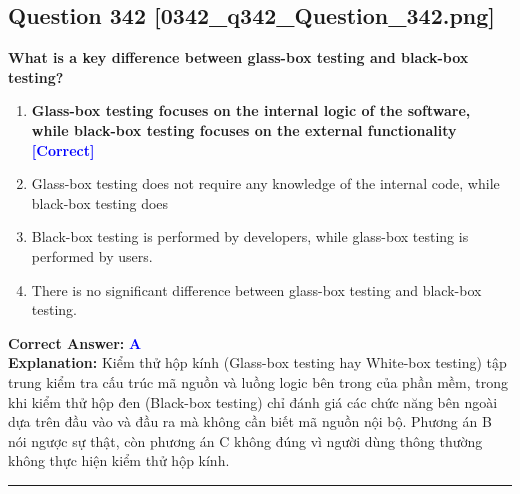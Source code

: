 \documentclass[11pt,a4paper]{article}
\begin{document}
\begin{minipage}{\textwidth}
\subsection*{Question 342 \quad \footnotesize{[0342\_q342\_Question\_342.png]}}
\noindent \textbf{What is a key difference between glass-box testing and black-box testing?}

\begin{enumerate}[label=\Alph*.]
    \item \textbf{Glass-box testing focuses on the internal logic of the software, while black-box testing focuses on the external functionality} \hfill \textcolor{blue}{\textbf{[Correct]}}
    \item Glass-box testing does not require any knowledge of the internal code, while black-box testing does
    \item Black-box testing is performed by developers, while glass-box testing is performed by users.
    \item There is no significant difference between glass-box testing and black-box testing.
\end{enumerate}

\noindent \textbf{Correct Answer:} \textcolor{blue}{\textbf{A}} \\[2pt]
\noindent \textbf{Explanation:} Kiểm thử hộp kính (Glass-box testing hay White-box testing) tập trung kiểm tra cấu trúc mã nguồn và luồng logic bên trong của phần mềm, trong khi kiểm thử hộp đen (Black-box testing) chỉ đánh giá các chức năng bên ngoài dựa trên đầu vào và đầu ra mà không cần biết mã nguồn nội bộ. Phương án B nói ngược sự thật, còn phương án C không đúng vì người dùng thông thường không thực hiện kiểm thử hộp kính.

\par\vspace{0.3cm}
\hrule
\vspace{0.3cm}
\end{minipage}
\end{document}
